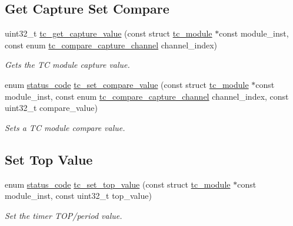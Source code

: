 \subsection*{Get Capture Set Compare}
\begin{DoxyCompactItemize}
\item 
uint32\+\_\+t \mbox{\hyperlink{group__asfdoc__sam0__tc__group_gaf780bb09a00298868aa3b8e7627f92ff}{tc\+\_\+get\+\_\+capture\+\_\+value}} (const struct \mbox{\hyperlink{structtc__module}{tc\+\_\+module}} $\ast$const module\+\_\+inst, const enum \mbox{\hyperlink{group__asfdoc__sam0__tc__group_ga01eca97dbfd588fd3ba0dcfd4792d857}{tc\+\_\+compare\+\_\+capture\+\_\+channel}} channel\+\_\+index)
\begin{DoxyCompactList}\small\item\em Gets the TC module capture value. \end{DoxyCompactList}\item 
enum \mbox{\hyperlink{group__group__sam0__utils__status__codes_ga751c892e5a46b8e7d282085a5a5bf151}{status\+\_\+code}} \mbox{\hyperlink{group__asfdoc__sam0__tc__group_ga687208b24fd33a1da0cbe683adc15fa6}{tc\+\_\+set\+\_\+compare\+\_\+value}} (const struct \mbox{\hyperlink{structtc__module}{tc\+\_\+module}} $\ast$const module\+\_\+inst, const enum \mbox{\hyperlink{group__asfdoc__sam0__tc__group_ga01eca97dbfd588fd3ba0dcfd4792d857}{tc\+\_\+compare\+\_\+capture\+\_\+channel}} channel\+\_\+index, const uint32\+\_\+t compare\+\_\+value)
\begin{DoxyCompactList}\small\item\em Sets a TC module compare value. \end{DoxyCompactList}\end{DoxyCompactItemize}
\subsection*{Set Top Value}
\begin{DoxyCompactItemize}
\item 
enum \mbox{\hyperlink{group__group__sam0__utils__status__codes_ga751c892e5a46b8e7d282085a5a5bf151}{status\+\_\+code}} \mbox{\hyperlink{group__asfdoc__sam0__tc__group_gac22d633ece43bcd18f54283778471340}{tc\+\_\+set\+\_\+top\+\_\+value}} (const struct \mbox{\hyperlink{structtc__module}{tc\+\_\+module}} $\ast$const module\+\_\+inst, const uint32\+\_\+t top\+\_\+value)
\begin{DoxyCompactList}\small\item\em Set the timer T\+O\+P/period value. \end{DoxyCompactList}\end{DoxyCompactItemize}



